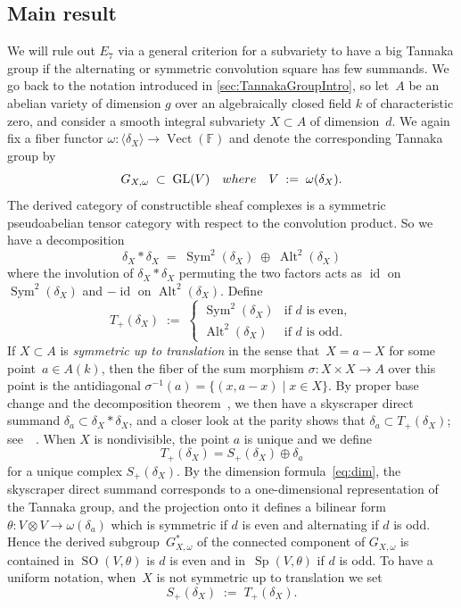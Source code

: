 \documentclass[a4paper]{amsart}
\newcommand{\bbF}{\mathbb{F}}
\DeclareMathOperator{\Vect}{Vect}
\DeclareMathOperator{\Sym}{Sym}
\DeclareMathOperator{\GL}{GL}
\DeclareMathOperator{\SO}{SO}
\DeclareMathOperator{\Sp}{Sp}
\DeclareMathOperator{\id}{id}
\DeclareMathOperator{\Alt}{Alt}
\theoremstyle{plain}
\theoremstyle{definition}
\numberwithin{equation}{section}
\begin{document}
\subsection{Main result} \label{sec:StatementsNoE7} We will rule out $E_7$ via a general criterion for a subvariety to have a big Tannaka group if the alternating or symmetric convolution square has few summands. We go back to the notation introduced in \cref{sec:TannakaGroupIntro}, so let~$A$ be an abelian variety of dimension $g$ over an algebraically closed field $k$ of characteristic zero, and consider a smooth integral subvariety $X \subset A$ of dimension~$d$. We again fix a fiber functor $\omega \colon \langle \delta_X \rangle \to \Vect(\bbF)$ and denote the corresponding Tannaka group by
\[ G_{X, \omega} \; \subset \; \GL(V) \quad \textup{where} \quad V \; := \; \omega(\delta_X).\]
The derived category of constructible sheaf complexes is a symmetric pseudoabelian tensor category with respect to the convolution product. So we have a decomposition
\[
 \delta_X * \delta_X \;=\; \Sym^2(\delta_X) \; \oplus \; \Alt^2(\delta_X)
\] 
where the involution of $\delta_X * \delta_X$ permuting the two factors acts as $\id$ on $\Sym^2(\delta_X)$ and $-\id$ on $\Alt^2(\delta_X)$. Define
\[
T_+(\delta_X) \;:=\;
 \begin{cases} 
 \Sym^2(\delta_X) & \text{if $d$ is even}, \\
 \Alt^2(\delta_X) & \text{if $d$ is odd}.
 \end{cases} 
\]
If $X\subset A$ is \emph{symmetric up to translation} in the sense that~$X = a - X$ for some point~$a \in A(k)$, then the fiber of the sum morphism $\sigma\colon X\times X \to A$ over this point is the antidiagonal $\sigma^{-1}(a)=\{(x, a-x)\mid x\in X\}$. By proper base change 
and the decomposition theorem~\cite[th.~6.2.5]{BBDG}, we then have a skyscraper direct summand $\delta_a\subset \delta_X*\delta_X$, and a closer look at the parity shows that $\delta_a \subset T_+(\delta_X)$; see~\cite[sect.~1.2]{JKLM}~\cite[lemma 2.1]{KWGeneric}. When $X$ is nondivisible, the point $a$ is unique and we define
\[ T_+(\delta_X) = S_+(\delta_X) \oplus \delta_a\]
for a unique complex $S_+(\delta_X)$. By the dimension formula~\eqref{eq:dim}, the skyscraper direct summand corresponds to a one-dimensional representation of the Tannaka group, and the projection onto it defines a bilinear form $\theta \colon  V \otimes V \to \omega(\delta_a)$ which is symmetric if $d$ is even and alternating if $d$ is odd. Hence the derived subgroup~$G_{X,\omega}^\ast$ of the connected component of $G_{X, \omega}$ is contained in $\SO(V, \theta)$ is $d$ is even and in~$\Sp(V, \theta)$ if $d$ is odd. To have a uniform notation, when~$X$ is not symmetric up to translation we set
\[ S_+(\delta_X) \; := \; T_+(\delta_X).\]
\end{document}
